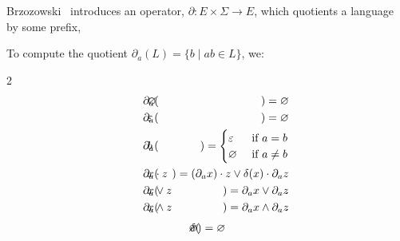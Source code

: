 \documentclass[sigplan,acmsmall,nonacm,screen]{acmart}\settopmatter{printfolios=false,printccs=false,printacmref=false}
\begin{document}
\noindent Brzozowski~\cite{brzozowski1964derivatives} introduces an operator, $\partial: E \times \Sigma \rightarrow E$, which quotients a language by some prefix,

\begin{definition}[Brzozowski, 1964]
  To compute the quotient \(\partial_a(L) = \{b \mid ab \in L\}\), we:

  \vspace{-0.8cm}
  \begin{multicols}{2}
    \begin{eqnarray*}
      \phantom{--}\partial_a(&\hspace{-0.35cm} \varnothing \hspace{-0.35cm}&) = \varnothing                                           \\
      \phantom{--}\partial_a(&\hspace{-0.35cm} \varepsilon \hspace{-0.35cm}&) = \varnothing                                           \\
      \phantom{--}\partial_a(&\hspace{-0.35cm} b           \hspace{-0.35cm}&) = \begin{cases}\varepsilon &\text{ if } a = b\\ \varnothing &\text{ if } a \neq b \end{cases}\\
      \phantom{--}\partial_a(&\hspace{-0.35cm} x\cdot z    \hspace{-0.35cm}&) = (\partial_a x)\cdot z \vee \delta(x)\cdot\partial_a z \\
      \phantom{--}\partial_a(&\hspace{-0.35cm} x\vee  z    \hspace{-0.35cm}&) =  \partial_a x \vee  \partial_a z                       \\
      \phantom{--}\partial_a(&\hspace{-0.35cm} x\land z    \hspace{-0.35cm}&) =  \partial_a x \land \partial_a z
    \end{eqnarray*} \break\vspace{-0.45cm}
    \begin{eqnarray*}
      \delta(&\hspace{-0.35cm} \varnothing \hspace{-0.35cm}&) = \varnothing                                      \\

\end{eqnarray*}
\end{multicols}
\end{definition}
\end{document}
